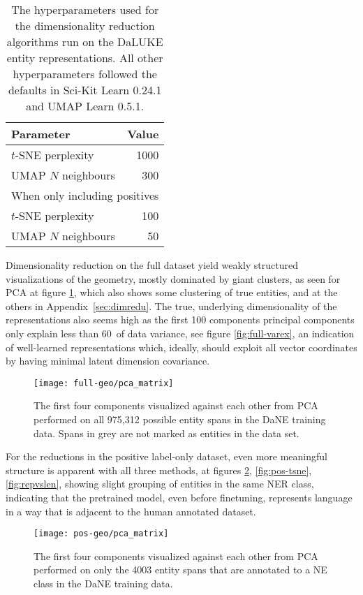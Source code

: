 \documentclass[main.tex]{subfiles}
\begin{document}
\begin{table}[H]
    \centering
    \begin{tabular}{l|r}
        Parameter           &  Value\\\hline
        $t$-SNE perplexity  &  1000   \\
        UMAP $N$ neighbours &  300\\\hline
        \multicolumn{2}{c}{When only including positives}\\\hline
        $t$-SNE perplexity  & 100\\
        UMAP $N$ neighbours & 50
    \end{tabular}
    \caption{
        The hyperparameters used for the dimensionality reduction algorithms run on the DaLUKE entity representations.
        All other hyperparameters followed the defaults in Sci-Kit Learn 0.24.1 and UMAP Learn 0.5.1.
    }\label{tab:dimreducer-hyper}
\end{table}\noindent
Dimensionality reduction on the full dataset yield weakly structured visualizations of the geometry, mostly dominated by giant clusters, as seen for PCA at figure \ref{fig:all-pca}, which also shows some clustering of true entities, and at the others in Appendix~\ref{sec:dimredu}.
The true, underlying dimensionality of the representations also seems high as the first 100 components principal components only explain less than 60\pro\ of data variance, see figure \ref{fig:full-varex}, an indication of well-learned representations which, ideally, should exploit all vector coordinates by having minimal latent dimension covariance.

\begin{figure}[H]
    \centering
        \texttt{[image: full-geo/pca\_matrix]}
    \caption{
        The first four components visualized against each other from PCA performed on all 975,312 possible entity spans in the DaNE training data.
        Spans in grey are not marked as entities in the data set.
    }
    \label{fig:all-pca}
\end{figure}\noindent
For the reductions in the positive label-only dataset, even more meaningful structure is apparent with all three methods, at figures \ref{fig:pos-pca}, \ref{fig:pos-tsne}, \ref{fig:repvslen}, showing slight grouping of entities in the same NER class, indicating that the pretrained model, even before finetuning, represents language in a way that is adjacent to the human annotated dataset.

\begin{figure}[H]
    \centering
        \texttt{[image: pos-geo/pca\_matrix]}
    \caption{
        The first four components visualized against each other from PCA performed on only the 4003 entity spans that are annotated to a NE class in the DaNE training data.
    }
    \label{fig:pos-pca}
\end{figure}\noindent
\end{document}
